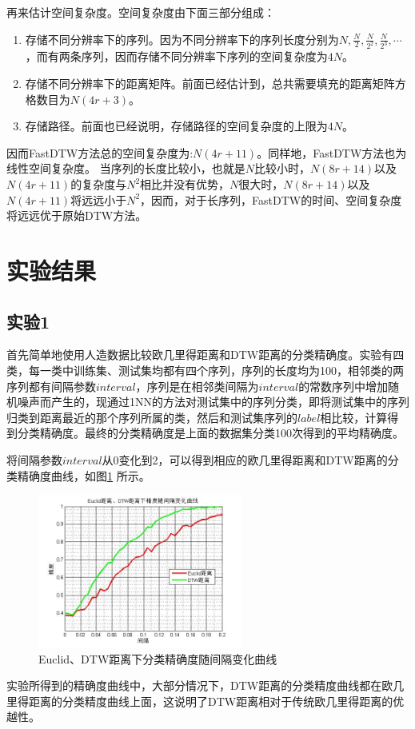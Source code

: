 再来估计空间复杂度。空间复杂度由下面三部分组成：
\begin{enumerate}
  \item 存储不同分辨率下的序列。因为不同分辨率下的序列长度分别为$N,\frac{N}{2},\frac{N}{2^2},\frac{N}{2^3},\cdots$，而有两条序列，因而存储不同分辨率下序列的空间复杂度为$4N$。
  \item 存储不同分辨率下的距离矩阵。前面已经估计到，总共需要填充的距离矩阵方格数目为$N(4r+3)$。
  \item 存储路径。前面也已经说明，存储路径的空间复杂度的上限为$4N$。
\end{enumerate}
因而FastDTW方法总的空间复杂度为:$N(4r+11)$。同样地，FastDTW方法也为线性空间复杂度。
当序列的长度比较小，也就是$N$比较小时，$N(8r+14)$以及$N(4r+11)$的复杂度与$N^2$相比并没有优势，$N$很大时，$N(8r+14)$以及$N(4r+11)$将远远小于$N^2$，因而，对于长序列，FastDTW的时间、空间复杂度将远远优于原始DTW方法。

\section{实验结果}
\subsection{实验1}
首先简单地使用人造数据比较欧几里得距离和DTW距离的分类精确度。实验有四类，每一类中训练集、测试集均都有四个序列，序列的长度均为100，相邻类的两序列都有间隔参数$interval$，序列是在相邻类间隔为$interval$的常数序列中增加随机噪声而产生的，现通过1NN的方法对测试集中的序列分类，即将测试集中的序列归类到距离最近的那个序列所属的类，然后和测试集序列的$label$相比较，计算得到分类精确度。最终的分类精确度是上面的数据集分类100次得到的平均精确度。

将间隔参数$interval$从0变化到2，可以得到相应的欧几里得距离和DTW距离的分类精确度曲线，如图\ref{fig:12} 所示。
\begin{figure}[h]
  \centering
  \includegraphics[width=0.6\textwidth]{./figure/interval.jpg}
  \caption{Euclid、DTW距离下分类精确度随间隔变化曲线}\label{fig:12}
\end{figure}
实验所得到的精确度曲线中，大部分情况下，DTW距离的分类精度曲线都在欧几里得距离的分类精度曲线上面，这说明了DTW距离相对于传统欧几里得距离的优越性。

